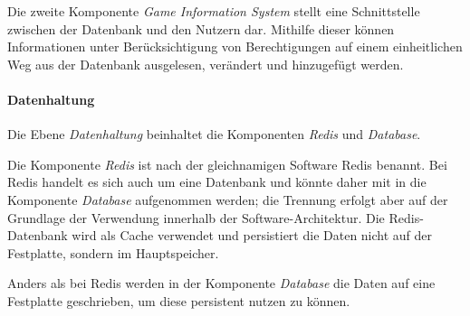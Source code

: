 Die zweite Komponente \textit{Game Information System} stellt eine Schnittstelle zwischen der Datenbank und den Nutzern dar. Mithilfe dieser können Informationen unter Berücksichtigung von Berechtigungen auf einem einheitlichen Weg aus der Datenbank ausgelesen, verändert und hinzugefügt werden. 

\paragraph{Datenhaltung}
Die Ebene \textit{Datenhaltung} beinhaltet die Komponenten \textit{Redis} und \textit{Database}. 

Die Komponente \textit{Redis} ist nach der gleichnamigen Software Redis benannt. Bei Redis handelt es sich auch um eine Datenbank und könnte daher mit in die Komponente \textit{Database} aufgenommen werden; die Trennung erfolgt aber auf der Grundlage der Verwendung innerhalb der Software-Architektur. Die Redis-Datenbank wird als Cache verwendet und persistiert die Daten nicht auf der Festplatte, sondern im Hauptspeicher.

Anders als bei Redis werden in der Komponente \textit{Database} die Daten auf eine Festplatte geschrieben, um diese persistent nutzen zu können.